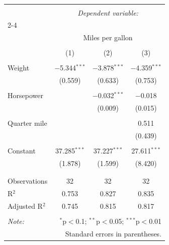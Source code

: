 
\begin{table}[!htbp] \centering
  \caption{}
  \label{}
\begin{tabular}{@{\extracolsep{5pt}}lccc}
\\[-1.8ex]\hline
\hline \\[-1.8ex]
 & \multicolumn{3}{c}{\textit{Dependent variable:}} \\
\cline{2-4}
\\[-1.8ex] & \multicolumn{3}{c}{Miles per gallon} \\
\\[-1.8ex] & (1) & (2) & (3)\\
\hline \\[-1.8ex]
 Weight & $-$5.344$^{***}$ & $-$3.878$^{***}$ & $-$4.359$^{***}$ \\
  & (0.559) & (0.633) & (0.753) \\
  & & & \\
 Horsepower &  & $-$0.032$^{***}$ & $-$0.018 \\
  &  & (0.009) & (0.015) \\
  & & & \\
 Quarter mile &  &  & 0.511 \\
  &  &  & (0.439) \\
  & & & \\
 Constant & 37.285$^{***}$ & 37.227$^{***}$ & 27.611$^{***}$ \\
  & (1.878) & (1.599) & (8.420) \\
  & & & \\
\hline \\[-1.8ex]
Observations & 32 & 32 & 32 \\
R$^{2}$ & 0.753 & 0.827 & 0.835 \\
Adjusted R$^{2}$ & 0.745 & 0.815 & 0.817 \\
\hline
\hline \\[-1.8ex]
\textit{Note:}  & \multicolumn{3}{r}{$^{*}$p$<$0.1; $^{**}$p$<$0.05; $^{***}$p$<$0.01} \\
 & \multicolumn{3}{r}{Standard errors in parentheses.} \\
\end{tabular}
\end{table}
